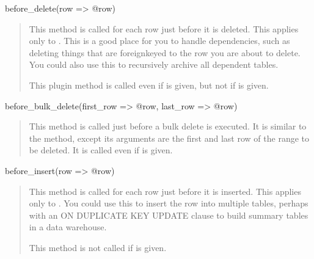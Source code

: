 \documentclass[letterpaper,10pt,english]{sphinxmanual}
\begin{document}
\sphinxAtStartPar
before\_delete(row =\textgreater{} @row)
\begin{quote}

\sphinxAtStartPar
This method is called for each row just before it is deleted.  This applies only
to {\hyperref[\detokenize{mariadb-archiver:cmdoption-mariadb-archiver-source}]{}}.  This is a good place for you to handle dependencies, such as
deleting things that are foreign\sphinxhyphen{}keyed to the row you are about to delete.  You
could also use this to recursively archive all dependent tables.

\sphinxAtStartPar
This plugin method is called even if {\hyperref[\detokenize{mariadb-archiver:cmdoption-mariadb-archiver-no-delete}]{}} is given, but not if
{\hyperref[\detokenize{mariadb-archiver:cmdoption-mariadb-archiver-bulk-delete}]{}} is given.
\end{quote}

\sphinxAtStartPar
before\_bulk\_delete(first\_row =\textgreater{} @row, last\_row =\textgreater{} @row)
\begin{quote}

\sphinxAtStartPar
This method is called just before a bulk delete is executed.  It is similar to
the  method, except its arguments are the first and last row of
the range to be deleted.  It is called even if {\hyperref[\detokenize{mariadb-archiver:cmdoption-mariadb-archiver-no-delete}]{}} is given.
\end{quote}

\sphinxAtStartPar
before\_insert(row =\textgreater{} @row)
\begin{quote}

\sphinxAtStartPar
This method is called for each row just before it is inserted.  This applies
only to {\hyperref[\detokenize{mariadb-archiver:cmdoption-mariadb-archiver-dest}]{}}.  You could use this to insert the row into multiple tables,
perhaps with an ON DUPLICATE KEY UPDATE clause to build summary tables in a data
warehouse.

\sphinxAtStartPar
This method is not called if {\hyperref[\detokenize{mariadb-archiver:cmdoption-mariadb-archiver-bulk-insert}]{}} is given.
\end{quote}
\end{document}
